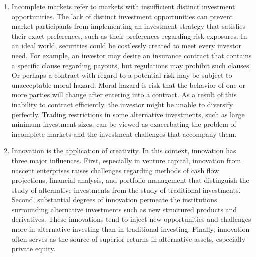 \documentclass[11pt]{article}
\begin{document}
\begin{enumerate}
  \item Incomplete markets refer to markets with insufficient distinct investment opportunities. The lack of distinct investment opportunities can prevent market participants from implementing an investment strategy that satisfies their exact preferences, such as their preferences regarding risk exposures. In an ideal world, securities could be costlessly created to meet every investor need. For example, an investor may desire an insurance contract that contains a specific clause regarding payouts, but regulations may prohibit such clauses. Or perhaps a contract with regard to a potential risk may be subject to unacceptable moral hazard. Moral hazard is risk that the behavior of one or more parties will change after entering into a contract. As a result of this inability to contract efficiently, the investor might be unable to diversify perfectly. Trading restrictions in some alternative investments, such as large minimum investment sizes, can be viewed as exacerbating the problem of incomplete markets and the investment challenges that accompany them.

  \item Innovation is the application of creativity. In this context, innovation has three major influences. First, especially in venture capital, innovation from nascent enterprises raises challenges regarding methods of cash flow projections, financial analysis, and portfolio management that distinguish the study of alternative investments from the study of traditional investments. Second, substantial degrees of innovation permeate the institutions surrounding alternative investments such as new structured products and derivatives. These innovations tend to inject new opportunities and challenges more in alternative investing than in traditional investing. Finally, innovation often serves as the source of superior returns in alternative assets, especially private equity.

\end{enumerate}
\end{document}
